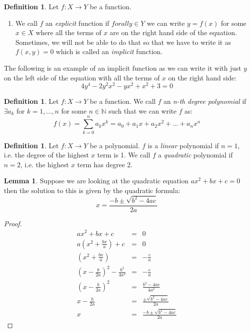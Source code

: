 \documentclass[11pt]{article}
\theoremstyle{definition}
\newtheorem{lemma}[prop]{Lemma}
\newtheorem{defn}[prop]{Definition}
\newcommand{\brac}[1]{\left(#1\right)}
\newcommand{\N}{\mathbb{N}}
\begin{document}
	\begin{defn}
		Let $f: X\rightarrow Y$ be a function.
		\begin{enumerate}
		\item We call $f$ an \emph{explicit} function if $forall y\in Y$ we can write $y = f\brac{x}$ for some $x\in X$ where all the terms of $x$ are on the right hand side of the equation. Sometimes, we will not be able to do that so that we have to write it as $f\brac{x,y} = 0$ which is called an \emph{implicit} function.
		\end{enumerate}
	\end{defn}
	The following is an example of an implicit function as we can write it with just $y$ on the left side of the equation with all the terms of $x$ on the right hand side:
	$$ 4y^4 -2y^2x^2 - yx^2 + x^2 + 3 = 0$$
	\begin{defn}
		Let $f: X\rightarrow Y$ be a function. We call $f$ an \emph{n-th degree polynomial} if $\exists a_k$ for $ k=1,\dots,n$ for some $n\in\N$ such that we can write $f$ as:
		$$ f\brac{x} = \sum_{k=0}^n a_k x^k = a_0 + a_1 x + a_2 x^2 + \dots + a_n x^n$$
	\end{defn}
	\begin{defn}
		Let $f: X\rightarrow Y$ be a polynomial. $f$ is a \emph{linear} polynomial if $n=1$, i.e. the degree of the highest $x$ term is 1. We call $f$ a \emph{quadratic} polynomial if $n=2$, i.e. the highest $x$ term has degree 2. 
	\end{defn}
	\begin{lemma}
	Suppose we are looking at the quadratic equation $ax^2 + bx + c = 0$ then the solution to this is given by the quadratic formula: 
	$$ x = \frac{-b \pm\sqrt{b^2 - 4ac}}{2a}$$
	\end{lemma}
	\begin{proof}
	\begin{eqnarray*}
		ax^2 + bx + c &=& 0\\
		a\brac{x^2 + \frac{bx}{a}} + c &=& 0\\
		\brac{x^2 + \frac{bx}{a}} &=& - \frac{c}{a}\\
		\brac{x-\frac{b}{2a}}^2 -\frac{b^2}{4a^2} &=& - \frac{c}{a}\\
		\brac{x-\frac{b}{2a}}^2 &=& \frac{b^2 - 4ac}{4a^2}\\
		x-\frac{b}{2a} &=& \frac{\pm\sqrt{b^2-4ac}}{2a}\\
		x &=& \frac{-b \pm\sqrt{b^2 - 4ac}}{2a}
	\end{eqnarray*}
	\end{proof}
\end{document}
